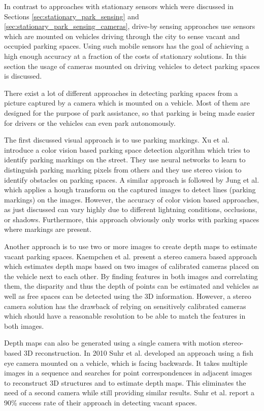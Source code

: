 In contrast to approaches with stationary sensors which were discussed in Sections \ref{sec:stationary_park_sensing} and \ref{sec:stationary_park_sensing_cameras}, drive-by sensing approaches use sensors which are mounted on vehicles driving through the city to sense vacant and occupied parking spaces. Using such mobile sensors has the goal of achieving a high enough accuracy at a fraction of the costs of stationary solutions. In this section the usage of cameras mounted on driving vehicles to detect parking spaces is discussed.

There exist a lot of different approaches in detecting parking spaces from a picture captured by a camera which is mounted on a vehicle. Most of them are designed for the purpose of park assistance, so that parking is being made easier for drivers or the vehicles can even park autonomously.

The first discussed visual approach is to use parking markings. Xu et al. \cite{Xu2000} introduce a color vision based parking space detection algorithm which tries to identify parking markings on the street. They use neural networks to learn to distinguish parking marking pixels from others and they use stereo vision to identify obstacles on parking spaces. A similar approach is followed by Jung et al. \cite{Jung2006} which applies a hough transform on the captured images to detect lines (parking markings) on the images. However, the accuracy of color vision based approaches, as just discussed can vary highly due to different lightning conditions, occlusions, or shadows. Furthermore, this approach obviously only works with parking spaces where markings are present.

Another approach is to use two or more images to create depth maps to estimate vacant parking spaces. Kaempchen et al. \cite{Kaempchen2002} present a stereo camera based approach which estimates depth maps based on two images of calibrated cameras placed on the vehicle next to each other. By finding features in both images and correlating them, the disparity and thus the depth of points can be estimated and vehicles as well as free spaces can be detected using the 3D information. However, a stereo camera solution has the drawback of relying on sensitively calibrated cameras which should have a reasonable resolution to be able to match the features in both images.

Depth maps can also be generated using a single camera with motion stereo-based 3D reconstruction. In 2010 Suhr et al. \cite{Suhr2010} developed an approach using a fish eye camera mounted on a vehicle, which is facing backwards. It takes multiple images in a sequence and searches for point correspondences in adjacent images to reconstruct 3D structures and to estimate depth maps. This eliminates the need of a second camera while still providing similar results. Suhr et al. report a 90\% success rate of their approach in detecting vacant spaces.

